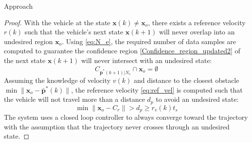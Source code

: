 \begin{section}{Approach}
\begin{proof}
With the vehicle at the state $\bm{x}(k) \neq \bm{x}_o$, there exists a reference velocity $r(k)$ such that the vehicle's next state $\bm{x}(k+1)$ will never overlap into an undesired region $\bm{x}_o$. Using \eqref{eq:N_e}, the required number of data samples are computed to guarantee the confidence region \eqref{Confidence_region_updated2} of the next state $\bm{x}(k+1)$ will never intersect with an undesired state:
\begin{equation}
    C_{\bar{\bm{p}}^*(k+1)|N_e} \cap \bm{x}_o = \emptyset \nonumber
\end{equation}
Assuming the knowledge of velocity $v(k)$ and distance to the closest obstacle $\min \lVert \bm{x}_o - \bar{\bm{p}}^*(k) \rVert$, the reference velocity \eqref{eq:ref_vel} is computed such that the vehicle will not travel more than a distance $d_p$ to avoid an undesired state:
\begin{equation}
    \min \lVert \bm{x}_o - C_r \rVert > d_p \geq r_v(k)t_s \nonumber
  \nonumber
\end{equation}
The system uses a closed loop controller to always converge toward the trajectory with the assumption that the trajectory never crosses through an undesired state.
\end{proof}





\end{section}
